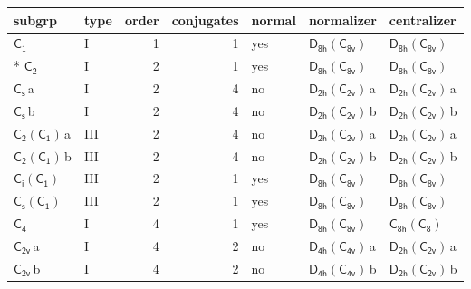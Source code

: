 \documentclass[10pt,a4paper]{article}
\numberwithin{equation}{section}
\newcommand{\grp}[1]{\mathsf{#1}}
\newcommand{\clsletter}[1]{\,{\scriptsize\color{black!55}#1}}
\begin{document}
{\small\begin{longtable}{@{}llrrlll@{}}\toprule
subgrp & type & order & conjugates & normal & normalizer & centralizer\\\midrule\endhead
\bottomrule\endfoot\endlastfoot
\href{../../../rotation/data/pdf/C1.pdf}{$\grp{C_{1}}$} & I & 1 & 1 & yes & \href{D8h-C8v.pdf}{$\grp{D_{8h}}(\grp{C_{8v}})$} & \href{D8h-C8v.pdf}{$\grp{D_{8h}}(\grp{C_{8v}})$}\\*
\href{../../../rotation/data/pdf/C2.pdf}{$\grp{C_{2}}$} & I & 2 & 1 & yes & \href{D8h-C8v.pdf}{$\grp{D_{8h}}(\grp{C_{8v}})$} & \href{D8h-C8v.pdf}{$\grp{D_{8h}}(\grp{C_{8v}})$}\\
\href{../../../rotation/data/pdf/C1v.pdf}{$\grp{C_{s}}$}\clsletter{a} & I & 2 & 4 & no & \href{D2h-C2v.pdf}{$\grp{D_{2h}}(\grp{C_{2v}})$}\clsletter{a} & \href{D2h-C2v.pdf}{$\grp{D_{2h}}(\grp{C_{2v}})$}\clsletter{a}\\
\href{../../../rotation/data/pdf/C1v.pdf}{$\grp{C_{s}}$}\clsletter{b} & I & 2 & 4 & no & \href{D2h-C2v.pdf}{$\grp{D_{2h}}(\grp{C_{2v}})$}\clsletter{b} & \href{D2h-C2v.pdf}{$\grp{D_{2h}}(\grp{C_{2v}})$}\clsletter{b}\\
\href{C2-C1.pdf}{$\grp{C_{2}}(\grp{C_{1}})$}\clsletter{a} & III & 2 & 4 & no & \href{D2h-C2v.pdf}{$\grp{D_{2h}}(\grp{C_{2v}})$}\clsletter{a} & \href{D2h-C2v.pdf}{$\grp{D_{2h}}(\grp{C_{2v}})$}\clsletter{a}\\
\href{C2-C1.pdf}{$\grp{C_{2}}(\grp{C_{1}})$}\clsletter{b} & III & 2 & 4 & no & \href{D2h-C2v.pdf}{$\grp{D_{2h}}(\grp{C_{2v}})$}\clsletter{b} & \href{D2h-C2v.pdf}{$\grp{D_{2h}}(\grp{C_{2v}})$}\clsletter{b}\\
\href{S2-C1.pdf}{$\grp{C_{i}}(\grp{C_{1}})$} & III & 2 & 1 & yes & \href{D8h-C8v.pdf}{$\grp{D_{8h}}(\grp{C_{8v}})$} & \href{D8h-C8v.pdf}{$\grp{D_{8h}}(\grp{C_{8v}})$}\\
\href{C1v-C1.pdf}{$\grp{C_{s}}(\grp{C_{1}})$} & III & 2 & 1 & yes & \href{D8h-C8v.pdf}{$\grp{D_{8h}}(\grp{C_{8v}})$} & \href{D8h-C8v.pdf}{$\grp{D_{8h}}(\grp{C_{8v}})$}\\
\href{../../../rotation/data/pdf/C4.pdf}{$\grp{C_{4}}$} & I & 4 & 1 & yes & \href{D8h-C8v.pdf}{$\grp{D_{8h}}(\grp{C_{8v}})$} & \href{C8h-C8.pdf}{$\grp{C_{8h}}(\grp{C_{8}})$}\\
\href{../../../rotation/data/pdf/C2v.pdf}{$\grp{C_{2v}}$}\clsletter{a} & I & 4 & 2 & no & \href{D4h-C4v.pdf}{$\grp{D_{4h}}(\grp{C_{4v}})$}\clsletter{a} & \href{D2h-C2v.pdf}{$\grp{D_{2h}}(\grp{C_{2v}})$}\clsletter{a}\\
\href{../../../rotation/data/pdf/C2v.pdf}{$\grp{C_{2v}}$}\clsletter{b} & I & 4 & 2 & no & \href{D4h-C4v.pdf}{$\grp{D_{4h}}(\grp{C_{4v}})$}\clsletter{b} & \href{D2h-C2v.pdf}{$\grp{D_{2h}}(\grp{C_{2v}})$}\clsletter{b}\\

\end{longtable}}
\end{document}
